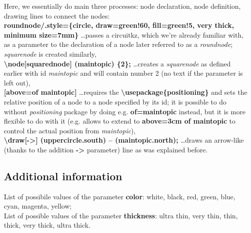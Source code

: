 \documentclass[11pt, a4paper]{article}
\begin{document}
		
		\noindent
		Here, we essentially do main three processes: node declaration, node definition, drawing lines to connect the nodes:\\
		\textbf{roundnode/.style=\{circle, draw=green!60, fill=green!5, very thick, minimum size=7mm\}} \dots passes a circuitkz, which we're already familiar with, as a parameter to the declaration of a node later referred to as a \textit{roundnode}; \textit{squarenode} is created similarly,\\
		\textbf{\textbackslash node[squarednode] (maintopic) \{2\};} \dots creates a \textit{squarenode} as defined earlier with id \textit{maintopic} and will contain number 2 (no text if the parameter is left out),\\
		\textbf{[above=of maintopic]} \dots requires the \textbf{\textbackslash usepackage\{positioning\}} and sets the relative position of a node to a node specified by its id; it is possible to do without \textit{positioning} package by doing e.g. \textbf{of=maintopic} instead, but it is more flexible to do with it (e.g. allows to extend to \textbf{above=3cm of maintopic} to control the actual position from \textit{maintopic}),\\
		\textbf{\textbackslash draw[->] (uppercircle.south) -- (maintopic.north);} \dots draws an arrow-like (thanks to the addition \textbf{->} parameter) line as was explained before.
		
		\subsection*{Additional information}
			
			\noindent
			List of possibile values of the parameter \textbf{color}: white, black, red, green, blue, cyan, magenta, yellow;\\[2mm]
			List of possible values of the parameter \textbf{thickness}: ultra thin, very thin, thin, thick, very thick, ultra thick.
	
	
	
	
	
\end{document}
